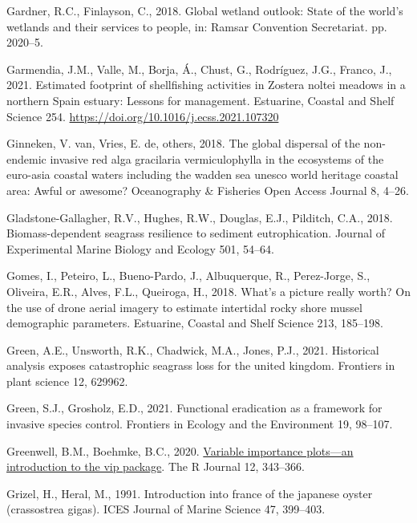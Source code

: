 \documentclass[
  letterpaper,
  11pt,
  english,
  singlespacing,
  headsepline]{MastersDoctoralThesis}
\newlength{\cslhangindent}
\newenvironment{CSLReferences}[2] %
 {\begin{list}{}{%
  \setlength{\itemindent}{0pt}
  \setlength{\leftmargin}{0pt}
  \setlength{\parsep}{0pt}
  \ifodd #1
   \setlength{\leftmargin}{\cslhangindent}
   \setlength{\itemindent}{-1\cslhangindent}
  \fi
  \setlength{\itemsep}{#2\baselineskip}}}
 {\end{list}}
\begin{document}
\begin{CSLReferences}{1}{0}
Gardner, R.C., Finlayson, C., 2018. Global wetland outlook: State of the
world's wetlands and their services to people, in: Ramsar Convention
Secretariat. pp. 2020--5.

Garmendia, J.M., Valle, M., Borja, Á., Chust, G., Rodríguez, J.G.,
Franco, J., 2021. {Estimated footprint of shellfishing activities in
Zostera noltei meadows in a northern Spain estuary: Lessons for
management}. Estuarine, Coastal and Shelf Science 254.
\url{https://doi.org/10.1016/j.ecss.2021.107320}

Ginneken, V. van, Vries, E. de, others, 2018. The global dispersal of
the non-endemic invasive red alga gracilaria vermiculophylla in the
ecosystems of the euro-asia coastal waters including the wadden sea
unesco world heritage coastal area: Awful or awesome? Oceanography \&
Fisheries Open Access Journal 8, 4--26.

Gladstone-Gallagher, R.V., Hughes, R.W., Douglas, E.J., Pilditch, C.A.,
2018. Biomass-dependent seagrass resilience to sediment eutrophication.
Journal of Experimental Marine Biology and Ecology 501, 54--64.

Gomes, I., Peteiro, L., Bueno-Pardo, J., Albuquerque, R., Perez-Jorge,
S., Oliveira, E.R., Alves, F.L., Queiroga, H., 2018. What's a picture
really worth? On the use of drone aerial imagery to estimate intertidal
rocky shore mussel demographic parameters. Estuarine, Coastal and Shelf
Science 213, 185--198.

Green, A.E., Unsworth, R.K., Chadwick, M.A., Jones, P.J., 2021.
Historical analysis exposes catastrophic seagrass loss for the united
kingdom. Frontiers in plant science 12, 629962.

Green, S.J., Grosholz, E.D., 2021. Functional eradication as a framework
for invasive species control. Frontiers in Ecology and the Environment
19, 98--107.

Greenwell, B.M., Boehmke, B.C., 2020.
\href{https://doi.org/10.32614/RJ-2020-013}{Variable importance
plots---an introduction to the vip package}. The R Journal 12, 343--366.

Grizel, H., Heral, M., 1991. Introduction into france of the japanese
oyster (crassostrea gigas). ICES Journal of Marine Science 47, 399--403.


\end{CSLReferences}
\end{document}

